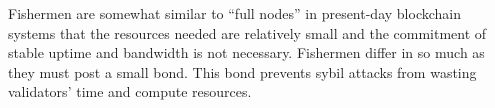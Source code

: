 
Fishermen are somewhat similar to “full nodes” in present-day blockchain systems that the resources needed are relatively small and the commitment of stable uptime and bandwidth is not necessary. Fishermen differ in so much as they must post a small bond. This bond prevents sybil attacks from wasting validators’ time and compute resources. %


